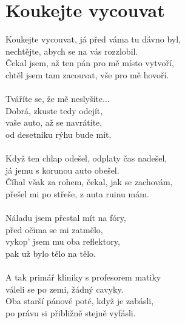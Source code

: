 \section{Koukejte vycouvat}
Koukejte vycouvat, já před váma tu dávno byl,\\
nechtějte, abych se na vás rozzlobil.\\
Čekal jsem, až ten pán pro mě místo vytvoří,\\
chtěl jsem tam zacouvat, vše pro mě hovoří.\\
\\
Tváříte se, že mě neslyšíte...\\
Dobrá, zkuste tedy odejít,\\
vaše auto, až se navrátíte,\\
od desetníku rýhu bude mít.\\
\\
Když ten chlap odešel, odplaty čas nadešel,\\
já jemu s korunou auto obešel.\\
Číhal však za rohem, čekal, jak se zachovám,\\
přešel mi po střeše, z auta ruinu mám.\\
\\
Náladu jsem přestal mít na fóry,\\
před očima se mi zatmělo,\\
vykop' jsem mu oba reflektory,\\
pak už bylo tělo na tělo.\\
\\
A tak primář kliniky s profesorem matiky\\
váleli se po zemi, žádný cavyky.\\
Oba starší pánové poté, když je zabásli,\\
po právu si přibližně stejně vyfásli.\\
